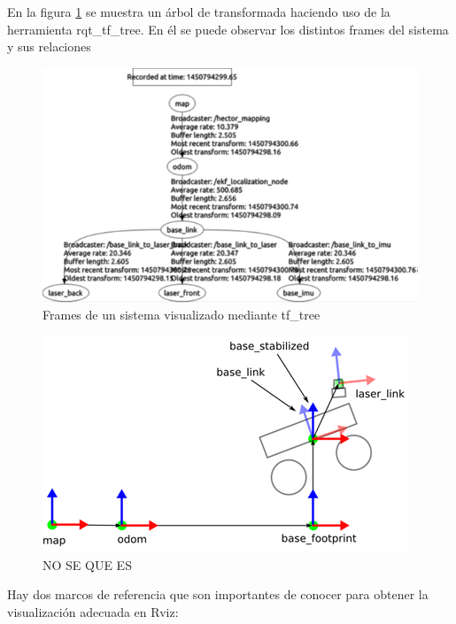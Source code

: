         En la figura \ref{f:Cap3-6_sistema_arbol_tf} se muestra un árbol de transformada haciendo uso de la herramienta rqt\_tf\_tree. En él se puede observar los distintos frames del sistema y sus relaciones
        
        \begin{figure}[htb]
            \centering
            \includegraphics[width=0.75\linewidth]{Main/Chapter3/Images3/3-6/ejemplo-frames-sistema-arbol.png}
            \caption{Frames de un sistema visualizado mediante tf\_tree}
            \label{f:Cap3-6_sistema_arbol_tf}
        \end{figure} 
        
                        \newpage

        
        \begin{figure}[htb]
            \centering
            \includegraphics[width=1.0\linewidth]{Main/Chapter3/Images3/3-6/nose2.png}
            \caption{NO SE QUE ES}
            \label{f:Cap3-6_NOSE_tf}
        \end{figure} 
        
        Hay dos marcos de referencia que son importantes de conocer para obtener la visualización adecuada en Rviz:
        
